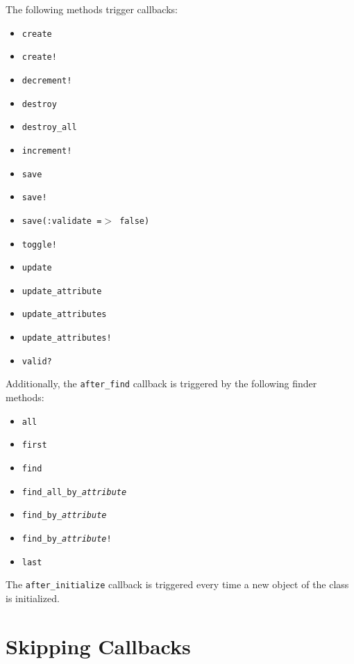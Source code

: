\documentclass[10pt]{book}
\begin{document}
The following methods trigger callbacks:
\begin{itemize}
	\item \texttt{create}
	\item \texttt{create!}
	\item \texttt{decrement!}
	\item \texttt{destroy}
	\item \texttt{destroy\_all}
	\item \texttt{increment!}
	\item \texttt{save}
	\item \texttt{save!}
	\item \texttt{save(:validate =$>$ false)}
	\item \texttt{toggle!}
	\item \texttt{update}
	\item \texttt{update\_attribute}
	\item \texttt{update\_attributes}
	\item \texttt{update\_attributes!}
	\item \texttt{valid?}
\end{itemize}

Additionally, the \texttt{after\_find} callback is triggered by the following finder methods:
\begin{itemize}
	\item \texttt{all}
	\item \texttt{first}
	\item \texttt{find}
	\item \texttt{find\_all\_by\_\emph{attribute}}
	\item \texttt{find\_by\_\emph{attribute}}
	\item \texttt{find\_by\_\emph{attribute}!}
	\item \texttt{last}
\end{itemize}

The \texttt{after\_initialize} callback is triggered every time a new object of the class is initialized.

\section{ Skipping Callbacks}
\end{document}

